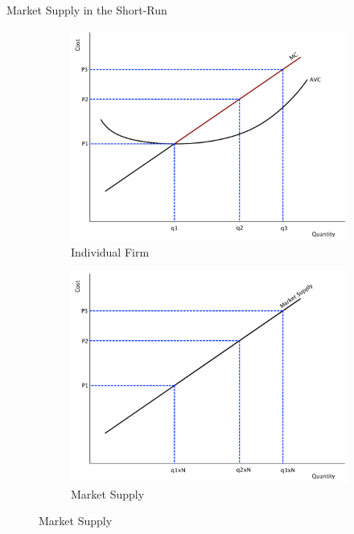 \documentclass[xcolor={dvipsnames},pdf, hyperref={colorlinks=true, citecolor=ForestGreen, linkcolor=BlueViolet, urlcolor=Magenta}, handout]{beamer}
\begin{document}
\begin{frame}{Market Supply in the Short-Run}
\begin{figure}[H]
	\centering
	\caption{Short-run Market Supply}
	\begin{subfigure}{.5\textwidth}
	\includegraphics[scale=.25]{plot66.pdf}
		\caption{Individual Firm}
	\end{subfigure}%
	\begin{subfigure}{.5\textwidth}
		\centering
	\includegraphics[scale=.25]{plot67.pdf}
		\caption{Market Supply}
	\end{subfigure}
\end{figure}

\end{frame}
\end{document}
